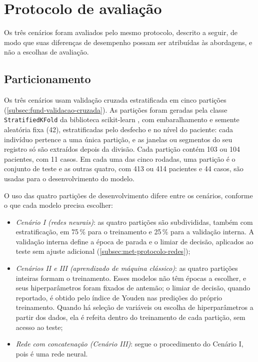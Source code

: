 
\section{Protocolo de avaliação}
\label{sec:met-avaliacao}

Os três cenários foram avaliados pelo mesmo protocolo, descrito a seguir,
de modo que suas diferenças de desempenho possam ser atribuídas às
abordagens, e não a escolhas de avaliação.

\subsection{Particionamento}
\label{subsec:met-particionamento}

Os três cenários usam validação cruzada estratificada em cinco partições
(\autoref{subsec:fund-validacao-cruzada}). As partições foram geradas pela
classe \texttt{StratifiedKFold} da biblioteca scikit-learn
\cite{pedregosa2011scikit}, com embaralhamento e semente aleatória fixa
(42), estratificadas pelo desfecho e no nível do paciente: cada indivíduo
pertence a uma única partição, e as janelas ou segmentos do seu registro só
são extraídos depois da divisão. Cada partição contém 103 ou 104 pacientes,
com 11 casos. Em cada uma das cinco rodadas, uma partição é o conjunto de
teste e as outras quatro, com 413 ou 414 pacientes e 44 casos, são usadas
para o desenvolvimento do modelo.

O uso das quatro partições de desenvolvimento difere entre os cenários,
conforme o que cada modelo precisa escolher:

\begin{itemize}
	\item \textit{Cenário I (redes neurais)}: as quatro partições são
	subdivididas, também com estratificação, em 75\,\% para o treinamento e
	25\,\% para a validação interna. A validação interna define a época de
	parada e o limiar de decisão, aplicados ao teste sem ajuste adicional
	(\autoref{subsec:met-protocolo-redes});
	\item \textit{Cenários II e III (aprendizado de máquina clássico)}: as
	quatro partições inteiras formam o treinamento. Esses modelos não têm
	épocas a escolher, e seus hiperparâmetros foram fixados de antemão; o
	limiar de decisão, quando reportado, é obtido pelo índice de Youden nas
	predições do próprio treinamento. Quando há seleção de variáveis ou
	escolha de hiperparâmetros a partir dos dados, ela é refeita dentro do
	treinamento de cada partição, sem acesso ao teste;
	\item \textit{Rede com concatenação (Cenário III)}: segue o
	procedimento do Cenário I, pois é uma rede neural.
\end{itemize}

